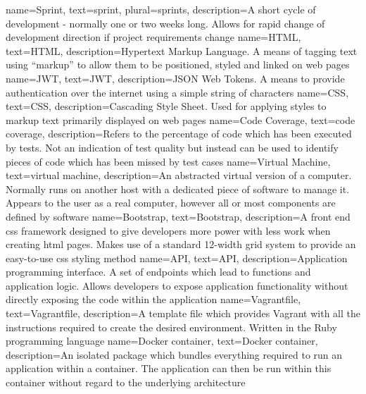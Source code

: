{
    name={Sprint},
    text={sprint},
    plural={sprints},
    description={A short cycle of development - normally one or two weeks long. Allows for rapid change of development direction if project requirements change}
}
{
    name={HTML},
    text={HTML},
    description={Hypertext Markup Language. A means of tagging text using ``markup'' to allow them to be positioned, styled and linked on web pages}
}
{
    name={JWT},
    text={JWT},
    description={JSON Web Tokens. A means to provide authentication over the internet using a simple string of characters}
}
{
    name={CSS},
    text={CSS},
    description={Cascading Style Sheet. Used for applying styles to markup text primarily displayed on web pages}
}
{
    name={Code Coverage},
    text={code coverage},
    description={Refers to the percentage of code which has been executed by tests. Not an indication of test quality but instead can be used to identify pieces of code which has been missed by test cases}
}
{
    name={Virtual Machine},
    text={virtual machine},
    description={An abstracted virtual version of a computer. Normally runs on another host with a dedicated piece of software to manage it. Appears to the user as a real computer, however all or most components are defined by software}
}
{
    name={Bootstrap},
    text={Bootstrap},
    description={A front end css framework designed to give developers more power with less work when creating html pages. Makes use of a standard 12-width grid system to provide an easy-to-use css styling method}
}
{
    name={API},
    text={API},
    description={Application programming interface. A set of endpoints which lead to functions and application logic. Allows developers to expose application functionality without directly exposing the code within the application}
}
{
    name={Vagrantfile},
    text={Vagrantfile},
    description={A template file which provides Vagrant with all the instructions required to create the desired environment. Written in the Ruby programming language}
}
{
    name={Docker container},
    text={Docker container},
    description={An isolated package which bundles everything required to run an application within a container. The application can then be run within this container without regard to the underlying architecture}
}
